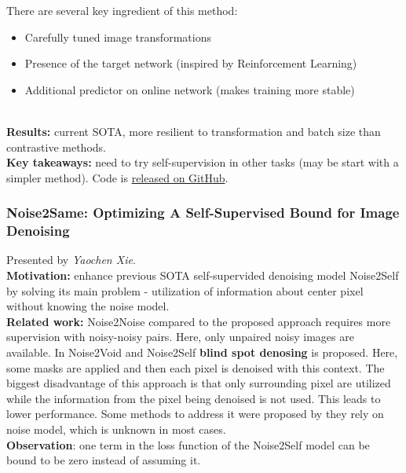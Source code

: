There are several key ingredient of this method:
\begin{itemize}
    \item Carefully tuned image transformations
    \item Presence of the target network (inspired by Reinforcement Learning)
    \item Additional predictor on online network (makes training more stable)
\end{itemize} \\

{\bf Results:} current SOTA, more resilient to transformation and batch size than contrastive methods. \\

{\bf Key takeaways:} need to try self-supervision in other tasks (may be start with a simpler method). Code is \href{https://github.com/lucidrains/byol-pytorch}{released on GitHub}. \\



\subsubsection{Noise2Same: Optimizing A Self-Supervised Bound for Image Denoising \cite{XieWJ20}}

Presented by \textit{Yaochen Xie}.  \\

{\bf Motivation:} enhance previous SOTA self-supervided denoising model Noise2Self \cite{BatsonR19} by solving its main problem - utilization of information about center pixel without knowing the noise model. \\

{\bf Related work:} Noise2Noise \cite{LehtinenMHLKAA18} compared to the proposed approach requires more supervision with noisy-noisy pairs. Here, only unpaired noisy images are available. In Noise2Void \cite{KrullBJ19} and Noise2Self \cite{BatsonR19} \textbf{blind spot denosing} is proposed. Here, some masks are applied and then each pixel is denoised with this context. The biggest disadvantage of this approach is that only surrounding pixel are utilized while the information from the pixel being denoised is not used. This leads to lower performance. Some methods to address it were proposed by they rely on noise model, which is unknown in most cases. \\

{\bf Observation}: one term in the loss function of the Noise2Self model can be bound to be zero instead of assuming it. \\

